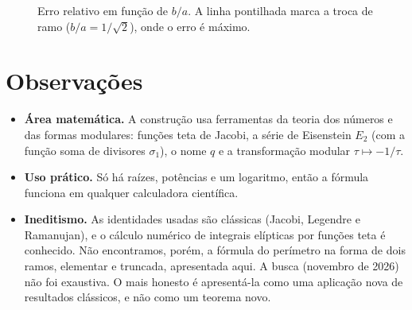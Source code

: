 \documentclass[11pt,a4paper]{article}
\theoremstyle{remark}
\begin{document}
\begin{figure}[H]
\centering
{}
\caption{Erro relativo em função de $b/a$. A linha pontilhada marca a troca de ramo
($b/a=1/\sqrt2$), onde o erro é máximo.}
\end{figure}

\section{Observações}

\begin{itemize}
\item \textbf{Área matemática.} A construção usa ferramentas da teoria dos números e das
formas modulares: funções teta de Jacobi, a série de Eisenstein $E_2$ (com a função soma de
divisores $\sigma_1$), o nome $q$ e a transformação modular $\tau\mapsto-1/\tau$.
\item \textbf{Uso prático.} Só há raízes, potências e um logaritmo, então a fórmula funciona em qualquer
calculadora científica.
\item \textbf{Ineditismo.} As identidades usadas são clássicas (Jacobi, Legendre e Ramanujan),
e o cálculo numérico de integrais elípticas por funções teta é conhecido. Não encontramos,
porém, a fórmula do perímetro na forma de dois ramos, elementar e truncada, apresentada
aqui. A busca (novembro de 2026) não foi exaustiva. O mais honesto é apresentá-la como uma
aplicação nova de resultados clássicos, e não como um teorema novo.
\end{itemize}
\end{document}
